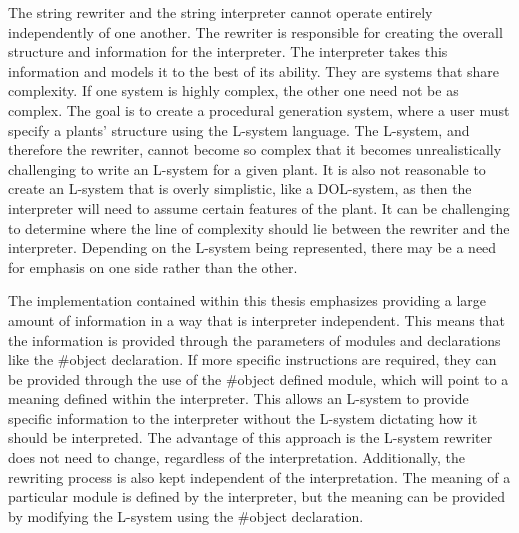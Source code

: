 The string rewriter and the string interpreter cannot operate entirely independently of one another. The rewriter is responsible for creating the overall structure and information for the interpreter. The interpreter takes this information and models it to the best of its ability. They are systems that share complexity. If one system is highly complex, the other one need not be as complex. The goal is to create a procedural generation system, where a user must specify a plants' structure using the L-system language. The L-system, and therefore the rewriter, cannot become so complex that it becomes unrealistically challenging to write an L-system for a given plant. It is also not reasonable to create an L-system that is overly simplistic, like a DOL-system, as then the interpreter will need to assume certain features of the plant.  It can be challenging to determine where the line of complexity should lie between the rewriter and the interpreter. Depending on the L-system being represented, there may be a need for emphasis on one side rather than the other.

The implementation contained within this thesis emphasizes providing a large amount of information in a way that is interpreter independent. This means that the information is provided through the parameters of modules and declarations like the \#object declaration. If more specific instructions are required, they can be provided through the use of the \#object defined module, which will point to a meaning defined within the interpreter. This allows an L-system to provide specific information to the interpreter without the L-system dictating how it should be interpreted. The advantage of this approach is the L-system rewriter does not need to change, regardless of the interpretation. Additionally, the rewriting process is also kept independent of the interpretation. The meaning of a particular module is defined by the interpreter, but the meaning can be provided by modifying the L-system using the \#object declaration. 

